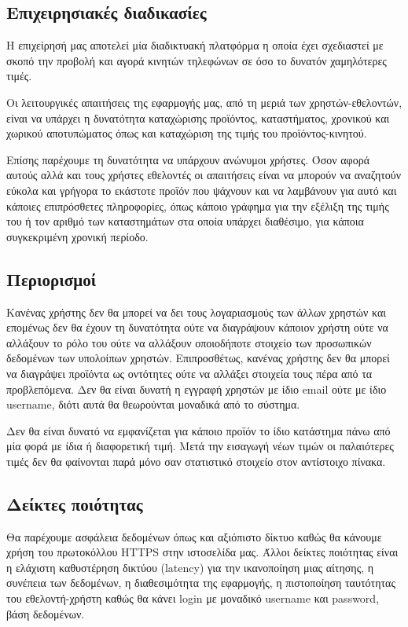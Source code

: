 \documentclass[12pt, oneside, a4paper]{report}
\begin{document}
\subsection{Επιχειρησιακές διαδικασίες}
\hspace{0.6cm}Η επιχείρησή μας αποτελεί μία διαδικτυακή πλατφόρμα η οποία έχει σχεδιαστεί με σκοπό την προβολή και αγορά κινητών τηλεφώνων σε όσο το δυνατόν χαμηλότερες τιμές.

\hspace{0.6cm}Οι λειτουργικές απαιτήσεις της εφαρμογής μας, από τη μεριά των χρηστών-εθελοντών, είναι να υπάρχει η δυνατότητα καταχώρισης προϊόντος, καταστήματος, χρονικού και χωρικού αποτυπώματος όπως και καταχώριση της τιμής του προϊόντος-κινητού. 

\hspace{0.6cm}Επίσης παρέχουμε τη δυνατότητα να υπάρχουν ανώνυμοι χρήστες. Όσον αφορά αυτούς αλλά και τους χρήστες εθελοντές οι απαιτήσεις είναι να μπορούν να αναζητούν εύκολα και γρήγορα το εκάστοτε προϊόν που ψάχνουν και να λαμβάνουν για αυτό και κάποιες επιπρόσθετες πληροφορίες, όπως κάποιο γράφημα για την εξέλιξη της τιμής του ή τον αριθμό των καταστημάτων στα οποία υπάρχει διαθέσιμο, για κάποια συγκεκριμένη χρονική περίοδο.

\subsection{Περιορισμοί}

\hspace{0.6cm}Κανένας χρήστης δεν θα μπορεί να δει τους λογαριασμούς των άλλων χρηστών και επομένως δεν θα έχουν τη δυνατότητα ούτε να διαγράψουν κάποιον χρήστη ούτε να αλλάξουν το ρόλο του ούτε να αλλάξουν οποιοδήποτε στοιχείο των προσωπικών δεδομένων των υπολοίπων χρηστών. Επιπροσθέτως, κανένας χρήστης δεν θα μπορεί να διαγράψει προϊόντα ως οντότητες ούτε να αλλάξει στοιχεία τους πέρα από τα προβλεπόμενα. Δεν θα είναι δυνατή η εγγραφή χρηστών με ίδιο email ούτε με ίδιο username, διότι αυτά θα θεωρούνται μοναδικά από το σύστημα.

\hspace{0.6cm}Δεν θα είναι δυνατό να εμφανίζεται για κάποιο προϊόν το ίδιο κατάστημα πάνω από μία φορά με ίδια ή διαφορετική τιμή. Μετά την εισαγωγή νέων τιμών οι παλαιότερες τιμές δεν θα φαίνονται παρά μόνο σαν στατιστικό στοιχείο στον αντίστοιχο πίνακα.

\subsection{Δείκτες ποιότητας}
\hspace{0.6cm}Θα παρέχουμε ασφάλεια δεδομένων όπως και αξιόπιστο δίκτυο καθώς θα κάνουμε χρήση του πρωτοκόλλου HTTPS στην ιστοσελίδα μας. Άλλοι δείκτες ποιότητας είναι η ελάχιστη καθυστέρηση δικτύου (latency) για την ικανοποίηση μιας αίτησης, η συνέπεια των δεδομένων, η διαθεσιμότητα της εφαρμογής, η πιστοποίηση ταυτότητας του εθελοντή-χρήστη καθώς θα κάνει login με μοναδικό username και password, βάση δεδομένων.
\end{document}
